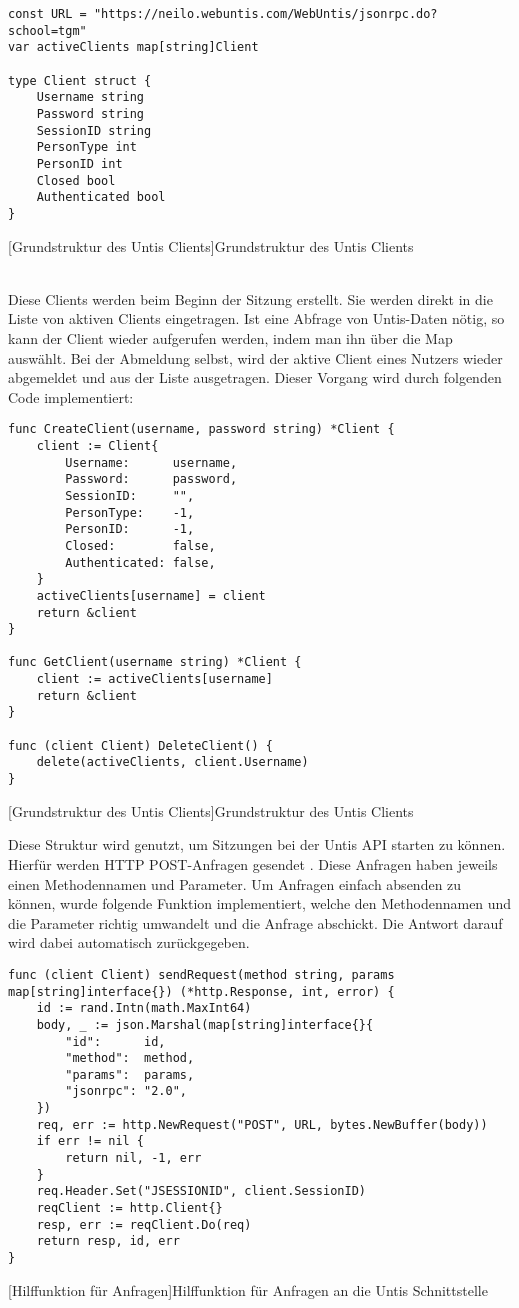 \begin{verbatim}
const URL = "https://neilo.webuntis.com/WebUntis/jsonrpc.do?school=tgm"
var activeClients map[string]Client

type Client struct {
	Username string
	Password string
	SessionID string
	PersonType int
	PersonID int
	Closed bool
	Authenticated bool
}
\end{verbatim}
[Grundstruktur des Untis Clients]{Grundstruktur des Untis Clients}

~\\ Diese Clients werden beim Beginn der Sitzung erstellt. Sie werden direkt in die Liste von aktiven Clients eingetragen. Ist eine Abfrage von Untis-Daten nötig, so kann der Client wieder aufgerufen werden, indem man ihn über die Map auswählt. Bei der Abmeldung selbst, wird der aktive Client eines Nutzers wieder abgemeldet und aus der Liste ausgetragen. Dieser Vorgang wird durch folgenden Code implementiert: 

\begin{verbatim}
func CreateClient(username, password string) *Client {
	client := Client{
		Username:      username,
		Password:      password,
		SessionID:     "",
		PersonType:    -1,
		PersonID:      -1,
		Closed:        false,
		Authenticated: false,
	}
	activeClients[username] = client
	return &client
}

func GetClient(username string) *Client {
	client := activeClients[username]
	return &client
}

func (client Client) DeleteClient() {
	delete(activeClients, client.Username)
}
\end{verbatim}
[Grundstruktur des Untis Clients]{Grundstruktur des Untis Clients}

Diese Struktur wird genutzt, um Sitzungen bei der Untis API starten zu können. Hierfür werden HTTP POST-Anfragen gesendet \cite{untis}. Diese Anfragen haben jeweils einen Methodennamen und Parameter. Um Anfragen einfach absenden zu können, wurde folgende Funktion implementiert, welche den Methodennamen und die Parameter richtig umwandelt und die Anfrage abschickt. Die Antwort darauf wird dabei automatisch zurückgegeben.
 
\begin{verbatim}
func (client Client) sendRequest(method string, params map[string]interface{}) (*http.Response, int, error) {
	id := rand.Intn(math.MaxInt64)
	body, _ := json.Marshal(map[string]interface{}{
		"id":      id,
		"method":  method,
		"params":  params,
		"jsonrpc": "2.0",
	})
	req, err := http.NewRequest("POST", URL, bytes.NewBuffer(body))
	if err != nil {
		return nil, -1, err
	}
	req.Header.Set("JSESSIONID", client.SessionID)
	reqClient := http.Client{}
	resp, err := reqClient.Do(req)
	return resp, id, err
}
\end{verbatim}
[Hilffunktion für Anfragen]{Hilffunktion für Anfragen an die Untis Schnittstelle \cite{untis}}

